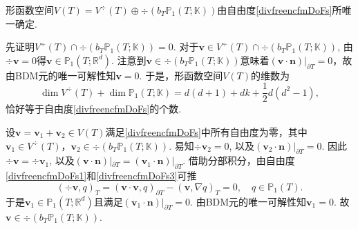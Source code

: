 \begin{lemma}\label{lem:divfreencfmunisol}
形函数空间$V(T)=V^{\div}(T)\oplus\div(b_T\mathbb P_1(T;\mathbb K))$由自由度\eqref{divfreencfmDoFs}所唯一确定.
\end{lemma}
\begin{prf}
先证明$V^{\div}(T)\cap\div(b_T\mathbb P_1(T;\mathbb K))=0$. 对于$\boldsymbol{v}\in V^{\div}(T)\cap\div(b_T\mathbb P_1(T;\mathbb K))$, 由$\div\boldsymbol{v}=0$得$\boldsymbol{v}\in\mathbb P_1(T;\mathbb R^d)$. 注意到$\boldsymbol{v}\in\div(b_T\mathbb P_1(T;\mathbb K))$意味着$(\boldsymbol{v}\cdot\boldsymbol{n})|_{\partial T}=0$，故由BDM元的唯一可解性知$\boldsymbol{v}=0$.
于是，形函数空间$V(T)$的维数为
\begin{equation*}
\dim V^{\div}(T)+\dim\mathbb P_1(T;\mathbb K)=d(d+1)+dk +\frac{1}{2}d(d^2-1),
\end{equation*}
恰好等于自由度\eqref{divfreencfmDoFs}的个数.

设$\boldsymbol{v}=\boldsymbol{v}_1+\boldsymbol{v}_2\in V(T)$满足\eqref{divfreencfmDoFs}中所有自由度为零，其中$\boldsymbol{v}_1\in V^{\div}(T)$，$\boldsymbol{v}_2\in \div(b_T\mathbb P_1(T;\mathbb K))$. 易知$\div\boldsymbol{v}_2=0$, 以及$(\boldsymbol{v}_2\cdot\boldsymbol{n})|_{\partial T}=0$.
因此$\div\boldsymbol{v}=\div\boldsymbol{v}_1$, 以及$(\boldsymbol{v}\cdot\boldsymbol{n})|_{\partial T}=(\boldsymbol{v}_1\cdot\boldsymbol{n})|_{\partial T}$. 借助分部积分，由自由度\eqref{divfreencfmDoFs1}和\eqref{divfreencfmDoFs3}可推
\begin{equation*}
(\div\boldsymbol{v}, q)_T=(\boldsymbol{v}\cdot\boldsymbol{v}, q)_{\partial T}-(\boldsymbol{v}, \nabla q)_T=0,\quad q\in\mathbb P_1(T).
\end{equation*}
于是$\boldsymbol{v}_1\in\mathbb P_1(T;\mathbb R^d)$且满足$(\boldsymbol{v}_1\cdot\boldsymbol{n})|_{\partial T}=0$. 由BDM元的唯一可解性知$\boldsymbol{v}_1=0$. 故$\boldsymbol{v}\in \div(b_T\mathbb P_1(T;\mathbb K))$.


\end{prf}
